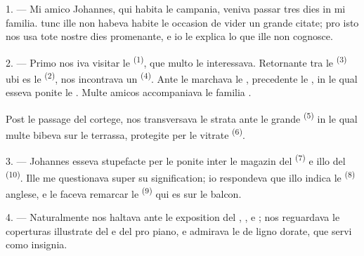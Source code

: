 
\VUsaut{4.0mm}
\VUsaut{3.0mm}

\VUsaut{3.0mm}

1. --- Mi amico Johannes, qui habita le campania, veniva passar tres dies in mi
familia.  tunc ille non habeva habite le occasion de vider un
grande citate; pro isto nos usa tote nostre dies promenante, e io le explica lo
que ille non cognosce.

2. --- Primo nos iva visitar le  \textsuperscript{(1)}, que
multo le interessava. Retornante tra le  \textsuperscript{(3)} ubi
es le  \textsuperscript{(2)}, nos incontrava un
 \textsuperscript{(4)}. Ante le  marchava
le , precedente le , in le qual esseva ponite
le . Multe amicos accompaniava le familia .

Post le passage del cortege, nos transversava le strata ante le grande
 \textsuperscript{(5)} in le qual multe 
bibeva  sur le terrassa, protegite per le 
vitrate \textsuperscript{(6)}.

3. --- Johannes esseva stupefacte per le  ponite inter le magazin
del  \textsuperscript{(7)} e illo del  \textsuperscript{(10)}. Ille me questionava super su signification; io
respondeva que illo indica le  \textsuperscript{(8)} anglese, e
le faceva remarcar le  \textsuperscript{(9)} qui es sur le
balcon.

\VUsaut{3.0mm}

4. --- Naturalmente nos haltava ante le exposition del , ,  e ; nos reguardava
le coperturas illustrate del  e del  pro piano,
e admirava le  de ligno dorate, que servi como insignia.

